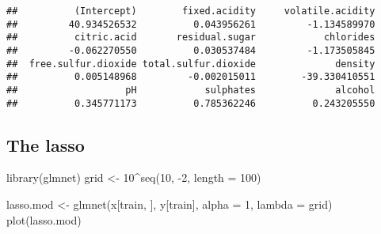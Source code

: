 \documentclass[
]{article}
\newenvironment{Shaded}{\begin{snugshade}}{\end{snugshade}}
\newcommand{\AttributeTok}[1]{\textcolor[rgb]{0.77,0.63,0.00}{#1}}
\newcommand{\DecValTok}[1]{\textcolor[rgb]{0.00,0.00,0.81}{#1}}
\newcommand{\FunctionTok}[1]{\textcolor[rgb]{0.00,0.00,0.00}{#1}}
\newcommand{\NormalTok}[1]{#1}
\newcommand{\OtherTok}[1]{\textcolor[rgb]{0.56,0.35,0.01}{#1}}
\newcommand{\SpecialCharTok}[1]{\textcolor[rgb]{0.00,0.00,0.00}{#1}}
\begin{document}
\begin{verbatim}
##          (Intercept)        fixed.acidity     volatile.acidity 
##         40.934526532          0.043956261         -1.134589970 
##          citric.acid       residual.sugar            chlorides 
##         -0.062270550          0.030537484         -1.173505845 
##  free.sulfur.dioxide total.sulfur.dioxide              density 
##          0.005148968         -0.002015011        -39.330410551 
##                   pH            sulphates              alcohol 
##          0.345771173          0.785362246          0.243205550
\end{verbatim}

\hypertarget{the-lasso}{%
\subsection{The lasso}\label{the-lasso}}

\begin{Shaded}
\end{Shaded}

\begin{Shaded}
\begin{Highlighting}[]
\FunctionTok{library}\NormalTok{(glmnet)}
\NormalTok{grid }\OtherTok{\textless{}{-}} \DecValTok{10}\SpecialCharTok{\^{}}\FunctionTok{seq}\NormalTok{(}\DecValTok{10}\NormalTok{, }\SpecialCharTok{{-}}\DecValTok{2}\NormalTok{, }\AttributeTok{length =} \DecValTok{100}\NormalTok{)}
\end{Highlighting}
\end{Shaded}

\begin{Shaded}
\begin{Highlighting}[]
\NormalTok{lasso.mod }\OtherTok{\textless{}{-}} \FunctionTok{glmnet}\NormalTok{(x[train, ], y[train], }\AttributeTok{alpha =} \DecValTok{1}\NormalTok{, }\AttributeTok{lambda =}\NormalTok{ grid)}
\FunctionTok{plot}\NormalTok{(lasso.mod)}
\end{Highlighting}
\end{Shaded}
\end{document}
